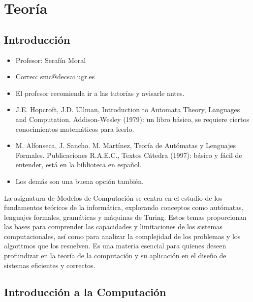 \documentclass[12pt]{report} %
\providecommand{\tightlist}{%
  \setlength{\itemsep}{0pt}\setlength{\parskip}{0pt}}
\begin{document}
\part{Teoría}

\hypertarget{introducciuxf3n}{%
\chapter{Introducción}\label{introducciuxf3n}}

\begin{itemize}
\tightlist
\item
  Profesor: Serafín Moral\\
\item
  Correo: smc@decsai.ugr.es\\
\item
  El profesor recomienda ir a las tutorías y avisarle antes.\\
\item
  J.E. Hopcroft, J.D. Ullman, Introduction to Automata Theory, Languages
  and Computation. Addison-Wesley (1979): un libro básico, se requiere
  ciertos conocimientos matemáticos para leerlo.\\
\item
  M. Alfonseca, J. Sancho. M. Martínez, Teoría de Autómatas y Lenguajes
  Formales. Publicaciones R.A.E.C., Textos Cátedra (1997): básico y
  fácil de entender, está en la biblioteca en español.\\
\item
  Los demás son una buena opción también.
\end{itemize}

La asignatura de Modelos de Computación se centra en el estudio de los
fundamentos teóricos de la informática, explorando conceptos como
autómatas, lenguajes formales, gramáticas y máquinas de Turing. Estos
temas proporcionan las bases para comprender las capacidades y
limitaciones de los sistemas computacionales, así como para analizar la
complejidad de los problemas y los algoritmos que los resuelven. Es una
materia esencial para quienes deseen profundizar en la teoría de la
computación y su aplicación en el diseño de sistemas eficientes y
correctos.

\hypertarget{introducciuxf3n-a-la-computaciuxf3n}{%
\chapter{Introducción a la
Computación}\label{introducciuxf3n-a-la-computaciuxf3n}}
\end{document}
